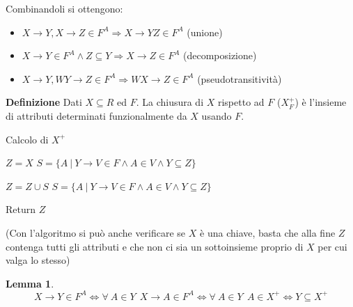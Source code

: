 \documentclass{article}
\newtheorem{lemma}[theorem]{Lemma}
\begin{document}
\noindent Combinandoli si ottengono:
\begin{itemize}
    \item $X\rightarrow Y,X\rightarrow Z\in F^A\Rightarrow X\rightarrow YZ\in F^A$ (unione)
    \item $X\rightarrow Y\in F^A\wedge Z\subseteq Y\Rightarrow X\rightarrow Z\in F^A$ (decomposizione)
    \item $X\rightarrow Y,WY\rightarrow Z\in F^A\Rightarrow WX\rightarrow Z \in F^A$ (pseudotransitività)\newline
\end{itemize}

\noindent\textbf{Definizione} Dati $X\subseteq R$ ed $F$. La chiusura di $X$ rispetto ad $F$ ($X^+_F$) è l'insieme di attributi determinati funzionalmente da $X$ usando $F$.\newline

\begin{algorithm}[ht]
\caption{Calcolo di $X^+$}
\begin{algorithmic}

\State $Z=X$
\State $S=\{A\ |\ Y\rightarrow V\in F\wedge A\in V\wedge Y\subseteq Z\}$


    \State $Z=Z\cup S$
    \State $S=\{A\ |\ Y\rightarrow V\in F\wedge A\in V\wedge Y\subseteq Z\}$

\EndWhile

\State Return $Z$

\end{algorithmic}
\end{algorithm}

\noindent (Con l'algoritmo si può anche verificare se $X$ è una chiave, basta che alla fine $Z$ contenga tutti gli attributi e che non ci sia un sottoinsieme proprio di $X$ per cui valga lo stesso)\newline

\begin{lemma}
    $$X\rightarrow Y\in F^A\iff \forall\ A\in Y\ \ X\rightarrow A\in F^A\iff \forall\ A\in Y\ \ A\in X^+\iff Y\subseteq X^+$$\newline
\end{lemma}
\end{document}
